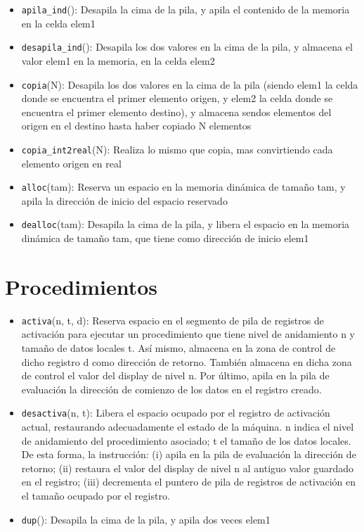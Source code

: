 \begin{itemize}
    \item \texttt{apila\_ind}(): Desapila la cima de la pila, y apila el contenido de la memoria en la celda elem1
    \item \texttt{desapila\_ind}(): Desapila los dos valores en la cima de la pila, y almacena el valor elem1 en la memoria, en la celda elem2
    \item \texttt{copia}(N): Desapila los dos valores en la cima de la pila (siendo elem1 la celda donde se encuentra el primer elemento origen, y elem2 la celda donde se encuentra el primer elemento destino), y almacena sendos elementos del origen en el destino hasta haber copiado N elementos
    \item \texttt{copia\_int2real}(N): Realiza lo mismo que copia, mas convirtiendo cada elemento origen en real
    \item \texttt{alloc}(tam): Reserva un espacio en la memoria dinámica de tamaño tam, y apila la dirección de inicio del espacio reservado
    \item \texttt{dealloc}(tam): Desapila la cima de la pila, y libera el espacio en la memoria dinámica de tamaño tam, que tiene como dirección de inicio elem1
\end{itemize}

\section{Procedimientos}

\begin{itemize}
    \item \texttt{activa}(n, t, d): Reserva espacio en el segmento de pila de registros de activación para ejecutar un procedimiento que tiene nivel de anidamiento n y tamaño de datos locales t. Así mismo, almacena en la zona de control de dicho registro d como dirección de retorno. También almacena en dicha zona de control el valor del display de nivel n. Por último, apila en la pila de evaluación la dirección de comienzo de los datos en el registro creado. 
    \item \texttt{desactiva}(n, t): Libera el espacio ocupado por el registro de activación actual, restaurando adecuadamente el estado de la máquina. n indica el nivel de anidamiento del procedimiento asociado; t el tamaño de los datos locales. De esta forma, la instrucción: (i) apila en la pila de evaluación la dirección de retorno; (ii) restaura el valor del display de nivel n al antiguo valor guardado en el registro; (iii) decrementa el puntero de pila de registros de activación en el tamaño ocupado por el registro.
    \item \texttt{dup}(): Desapila la cima de la pila, y apila dos veces elem1
\end{itemize}

